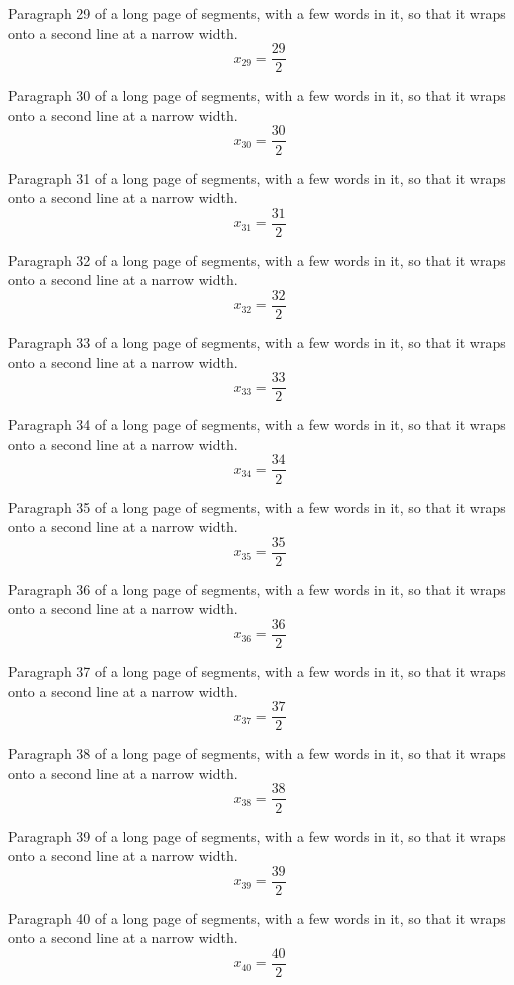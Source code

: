 Paragraph 29 of a long page of segments, with a few words in it, so that it wraps onto a second line at a narrow width.
\[ x_{29} = \frac{29}{2} \]

Paragraph 30 of a long page of segments, with a few words in it, so that it wraps onto a second line at a narrow width.
\[ x_{30} = \frac{30}{2} \]

Paragraph 31 of a long page of segments, with a few words in it, so that it wraps onto a second line at a narrow width.
\[ x_{31} = \frac{31}{2} \]

Paragraph 32 of a long page of segments, with a few words in it, so that it wraps onto a second line at a narrow width.
\[ x_{32} = \frac{32}{2} \]

Paragraph 33 of a long page of segments, with a few words in it, so that it wraps onto a second line at a narrow width.
\[ x_{33} = \frac{33}{2} \]

Paragraph 34 of a long page of segments, with a few words in it, so that it wraps onto a second line at a narrow width.
\[ x_{34} = \frac{34}{2} \]

Paragraph 35 of a long page of segments, with a few words in it, so that it wraps onto a second line at a narrow width.
\[ x_{35} = \frac{35}{2} \]

Paragraph 36 of a long page of segments, with a few words in it, so that it wraps onto a second line at a narrow width.
\[ x_{36} = \frac{36}{2} \]

Paragraph 37 of a long page of segments, with a few words in it, so that it wraps onto a second line at a narrow width.
\[ x_{37} = \frac{37}{2} \]

Paragraph 38 of a long page of segments, with a few words in it, so that it wraps onto a second line at a narrow width.
\[ x_{38} = \frac{38}{2} \]

Paragraph 39 of a long page of segments, with a few words in it, so that it wraps onto a second line at a narrow width.
\[ x_{39} = \frac{39}{2} \]

Paragraph 40 of a long page of segments, with a few words in it, so that it wraps onto a second line at a narrow width.
\[ x_{40} = \frac{40}{2} \]

